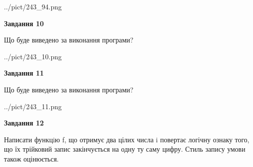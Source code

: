 \documentclass[12pt, ukrainian]{article}
\begin{document}
{\begin {large}
\begin{center}
	{../pict/243_94.png}
\end{center}
\newpage

{\begin {center}\textbf{Завдання 10}\end {center}}

Що буде виведено за виконання програми?\par
\begin{center}
	{../pict/243_10.png}
\end{center}
\newpage

{\begin {center}\textbf{Завдання 11}\end {center}}

Що буде виведено за виконання програми?\par
\begin{center}
	{../pict/243_11.png}
\end{center}
\newpage

{\begin {center}\textbf{Завдання 12}\end {center}}


Написати функцiю f, що отримує два цілих числа i повертає логічну ознаку того, що їх трійковий запис закінчується на одну ту саму цифру. Стиль запису умови також оцінюється.\par
\newpage

\end {large}}
\end{document}
